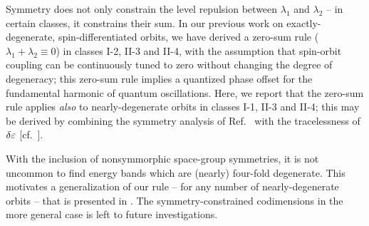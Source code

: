 Symmetry does not only constrain the level repulsion between $\lambda_1$ and $\lambda_2$ -- in certain classes, it constrains their sum. In our previous work on exactly-degenerate, spin-differentiated orbits\cite{100p,topoferm}, we have derived a zero-sum rule ($\lambda_1{+}\lambda_2{\equiv}0$) in classes I-2, II-3 and II-4, with the assumption that spin-orbit coupling can be continuously tuned to zero without changing the degree of degeneracy; this zero-sum rule implies a quantized phase offset for the fundamental harmonic of quantum oscillations\cite{topoferm}. Here, we report that the zero-sum rule applies \textit{also} to nearly-degenerate orbits in classes I-1, II-3 and II-4; this may be derived by combining the symmetry analysis of Ref.\  with the tracelessness of $\delta\varepsilon$ [cf.\ ]. 


With the inclusion of nonsymmorphic space-group symmetries, it is not uncommon to find energy bands which are (nearly) four-fold degenerate\cite{michel_elementary_2001,wang_hourglass_2016,bradlyn_topological_2017}. This motivates a generalization of our rule -- for any number of nearly-degenerate orbits -- that is presented in . The symmetry-constrained codimensions in the more general case is left to future investigations. 